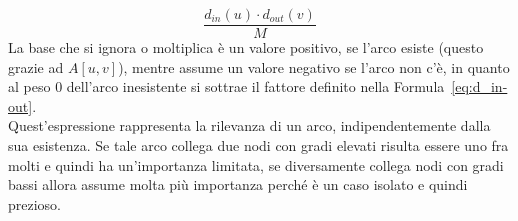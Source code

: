 \begin{equation}
	\frac{ d_{in}\left(u\right) \cdot d_{out}\left(v\right) }{M}
	\label{eq:d_in-out}
\end{equation}
La base che si ignora o moltiplica è un valore positivo, se l'arco esiste (questo grazie ad $\displaystyle A \left[ u,v \right]$), mentre assume un valore negativo se l'arco non c'è, in quanto al peso $0$ dell'arco inesistente si sottrae il fattore definito nella Formula~\ref{eq:d_in-out}.\\
Quest'espressione rappresenta la rilevanza di un arco, indipendentemente dalla sua esistenza. Se tale arco collega due nodi con gradi elevati risulta essere uno fra molti e quindi ha un'importanza limitata, se diversamente collega nodi con gradi bassi allora assume molta più importanza perché è un caso isolato e quindi prezioso.
%



